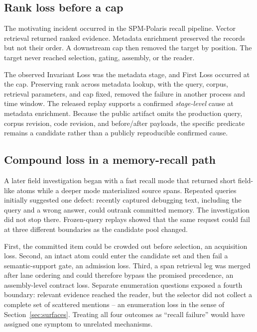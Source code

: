 \documentclass[10pt]{article}
\begin{document}
\subsection{Rank loss before a cap}

The motivating incident occurred in the SPM-Polaris recall pipeline. Vector retrieval returned ranked evidence. Metadata enrichment preserved the records but not their order. A downstream cap then removed the target by position. The target never reached selection, gating, assembly, or the reader.

The observed Invariant Loss was the metadata stage, and First Loss occurred at the cap. Preserving rank across metadata lookup, with the query, corpus, retrieval parameters, and cap fixed, removed the failure in another process and time window. The released replay supports a confirmed \emph{stage-level} cause at metadata enrichment. Because the public artifact omits the production query, corpus revision, code revision, and before/after payloads, the specific predicate remains a candidate rather than a publicly reproducible confirmed cause.

\subsection{Compound loss in a memory-recall path}

A later field investigation began with a fast recall mode that returned short field-like atoms while a deeper mode materialized source spans. Repeated queries initially suggested one defect: recently captured debugging text, including the query and a wrong answer, could outrank committed memory. The investigation did not stop there. Frozen-query replays showed that the same request could fail at three different boundaries as the candidate pool changed.

First, the committed item could be crowded out before selection, an acquisition loss. Second, an intact atom could enter the candidate set and then fail a semantic-support gate, an admission loss. Third, a span retrieval leg was merged after lane ordering and could therefore bypass the promised precedence, an assembly-level contract loss. Separate enumeration questions exposed a fourth boundary: relevant evidence reached the reader, but the selector did not collect a complete set of scattered mentions -- an enumeration loss in the sense of Section~\ref{sec:surfaces}. Treating all four outcomes as ``recall failure'' would have assigned one symptom to unrelated mechanisms.
\end{document}
